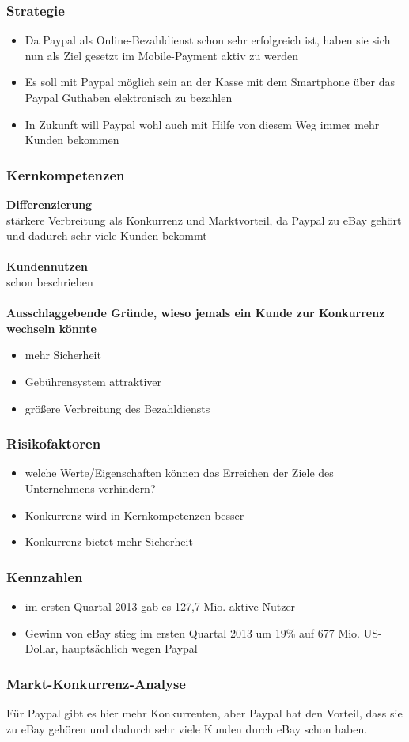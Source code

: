\subsubsection{Strategie}
\begin{itemize}
\item Da Paypal als Online-Bezahldienst schon sehr erfolgreich ist, haben sie sich nun als Ziel gesetzt im Mobile-Payment aktiv zu werden
\item Es soll mit Paypal möglich sein an der Kasse mit dem Smartphone über das Paypal Guthaben elektronisch zu bezahlen
\item In Zukunft will Paypal wohl auch mit Hilfe von diesem Weg immer mehr Kunden bekommen
\end{itemize}
\subsubsection{Kernkompetenzen}
\textbf{Differenzierung}\\
stärkere Verbreitung als Konkurrenz und Marktvorteil, da Paypal zu eBay gehört und dadurch sehr viele Kunden bekommt\\
\\
\textbf{Kundennutzen}\\
schon beschrieben\\
\\
\textbf{Ausschlaggebende Gründe, wieso jemals ein Kunde zur Konkurrenz wechseln könnte}
\begin{itemize}
\item mehr Sicherheit
\item Gebührensystem attraktiver
\item größere Verbreitung des Bezahldiensts
\end{itemize}

\subsubsection{Risikofaktoren}
\begin{itemize}
\item welche Werte/Eigenschaften können das Erreichen der Ziele des Unternehmens verhindern?
\item Konkurrenz wird in Kernkompetenzen besser
\item Konkurrenz bietet mehr Sicherheit
\end{itemize}

\subsubsection{Kennzahlen}
\begin{itemize}
\item im ersten Quartal 2013 gab es 127,7 Mio. aktive Nutzer
\item Gewinn von eBay stieg im ersten Quartal 2013 um 19\% auf 677 Mio. US-Dollar, hauptsächlich wegen Paypal
\end{itemize}
\subsubsection{Markt-Konkurrenz-Analyse}
Für Paypal gibt es hier mehr Konkurrenten, aber Paypal hat den Vorteil, dass sie zu eBay gehören und dadurch sehr viele Kunden durch eBay schon haben.
